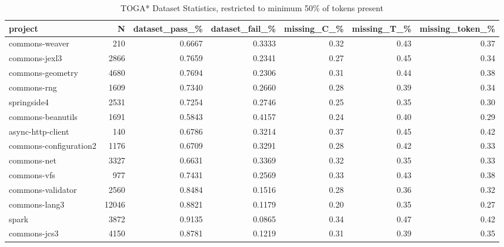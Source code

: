\begin{table*}
\centering
\caption{TOGA* Dataset Statistics, restricted to minimum 50\% of tokens present}
\label{tab:toga_stats_50}
\begin{tabular}{lrrrrrr}
\toprule
                project &       N &  dataset\_pass\_\% &  dataset\_fail\_\% &  missing\_C\_\% &  missing\_T\_\% &  missing\_token\_\% \\
\midrule
         commons-weaver &     210 &          0.6667 &          0.3333 &         0.32 &         0.43 &             0.37 \\
          commons-jexl3 &    2866 &          0.7659 &          0.2341 &         0.27 &         0.45 &             0.34 \\
       commons-geometry &    4680 &          0.7694 &          0.2306 &         0.31 &         0.44 &             0.38 \\
            commons-rng &    1609 &          0.7340 &          0.2660 &         0.28 &         0.39 &             0.34 \\
            springside4 &    2531 &          0.7254 &          0.2746 &         0.25 &         0.35 &             0.30 \\
      commons-beanutils &    1691 &          0.5843 &          0.4157 &         0.24 &         0.40 &             0.29 \\
      async-http-client &     140 &          0.6786 &          0.3214 &         0.37 &         0.45 &             0.42 \\
 commons-configuration2 &    1176 &          0.6709 &          0.3291 &         0.28 &         0.42 &             0.33 \\
            commons-net &    3327 &          0.6631 &          0.3369 &         0.32 &         0.35 &             0.33 \\
            commons-vfs &     977 &          0.7431 &          0.2569 &         0.33 &         0.43 &             0.38 \\
      commons-validator &    2560 &          0.8484 &          0.1516 &         0.28 &         0.36 &             0.32 \\
          commons-lang3 &   12046 &          0.8821 &          0.1179 &         0.20 &         0.35 &             0.27 \\
                  spark &    3872 &          0.9135 &          0.0865 &         0.34 &         0.47 &             0.42 \\
           commons-jcs3 &    4150 &          0.8781 &          0.1219 &         0.31 &         0.39 &             0.35 \\

\end{tabular}
\end{table*}
